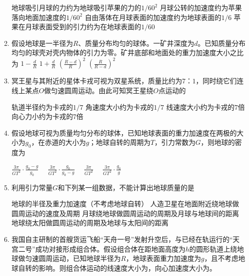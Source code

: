 \begin{enumerate}[leftmargin=0em]
\fourchoices
{地球吸引月球的力约为地球吸引苹果的力的$ 1/60^2 $}
{月球公转的加速度约为苹果落向地面加速度的$ 1/60^2 $}
{自由落体在月球表面的加速度约为地球表面的$ 1/6 $}
{苹果在月球表面受到的引力约为在地球表面的$ 1/60 $}


\item 
{}
假设地球是一半径为$ R $、质量分布均匀的球体。一矿井深度为$ d $。已知质量分布均匀的球壳对壳内物体的引力为零。矿井底部和地面处的重力加速度大小之比为  
\fourchoices
{$ 1 - \frac { d } { R } $}
{$ 1 + \frac { d } { R } $}
{$ \left( \frac { R - d } { R } \right) ^ { 2 } $}
{$ \left( \frac { R } { R - d } \right) ^ { 2 } $}
\item 
{}
冥王星与其附近的星体卡戎可视为双星系统，质量比约为$ 7 $：$ 1 $，同时绕它们连线上某点$ O $做匀速圆周运动。由此可知冥王星绕$ O $点运动的  

\fourchoices
{轨道半径约为卡戎的$ 1/7 $}
{角速度大小约为卡戎的$ 1/7 $}
{线速度大小约为卡戎的$ 7 $倍}
{向心力小约为卡戎的$ 7 $倍}

\item 
{}
假设地球可视为质量均匀分布的球体，已知地球表面的重力加速度在两极的大小为$ g_{0} $，在赤道的大小为$ g $；地球自转的周期为$ T $，引力常数为$ G $，则地球的密度为  

\fourchoices
{$\frac { 3 \pi } { G T ^ { 2 } } \cdot \frac { g _ { 0 } - g } { g _ { 0 } } \quad$}
{$\frac { 3 \pi } { G T ^ { 2 } } \cdot \frac { g _ { 0 } } { g _ { 0 } - g } \quad$}
{$\frac { 3 \pi } { G T ^ { 2 } } \quad$}
{$\frac { 3 \pi } { G T ^ { 2 } } \cdot \frac { g _ { 0 } } { g }$}


\item 
{}
利用引力常量$ G $和下列某一组数据，不能计算出地球质量的是  

\fourchoices
{地球的半径及重力加速度（不考虑地球自转）}
{人造卫星在地面附近绕地球做圆周运动的速度及周期}
{月球绕地球做圆周运动的周期及月球与地球间的距离}
{地球绕太阳做圆周运动的周期及地球与太阳间的距离}


\item 
{}
我国自主研制的首艘货运飞船“天舟一号”发射升空后，与已经在轨运行的“天宫二号”成功对接形成组合体。假设组合体在距地面高度为$ h $的圆形轨道上绕地球做匀速圆周运动，已知地球半径为$ R $，地球表面重力加速度为$ g $，且不考虑地球自转的影响。则组合体运动的线速度大小为，向心加速度大小为。




\end{enumerate}
